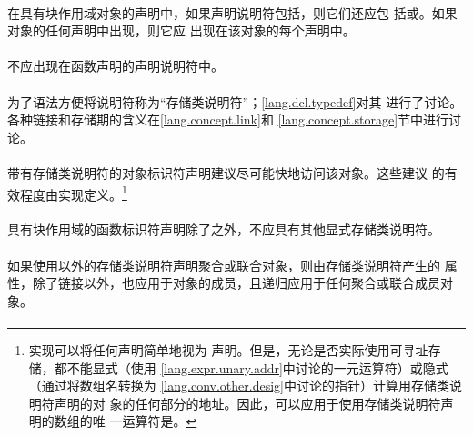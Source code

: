 {\paragraph{}
在具有块作用域对象的声明中，如果声明说明符包括，则它们还应包
括或。如果对象的任何声明中出现，则它应
出现在该对象的每个声明中。

\paragraph{}
不应出现在函数声明的声明说明符中。

\semantic
\paragraph{}
为了语法方便将说明符称为``存储类说明符''；\ref{lang.dcl.typedef}对其
进行了讨论。各种链接和存储期的含义在\ref{lang.concept.link}和
\ref{lang.concept.storage}节中进行讨论。

\paragraph{}
带有存储类说明符的对象标识符声明建议尽可能快地访问该对象。这些建议
的有效程度由实现定义。\footnote{实现可以将任何声明简单地视为
声明。但是，无论是否实际使用可寻址存储，都不能显式（使用
\ref{lang.expr.unary.addr}中讨论的一元运算符）或隐式（通过将数组名转换为
\ref{lang.conv.other.desig}中讨论的指针）计算用存储类说明符声明的对
象的任何部分的地址。因此，可以应用于使用存储类说明符声明的数组的唯
一运算符是。}

\paragraph{}
具有块作用域的函数标识符声明除了之外，不应具有其他显式存储类说明符。

\paragraph{}
如果使用以外的存储类说明符声明聚合或联合对象，则由存储类说明符产生的
属性，除了链接以外，也应用于对象的成员，且递归应用于任何聚合或联合成员对象。


\syntax
\paragraph{}

}
